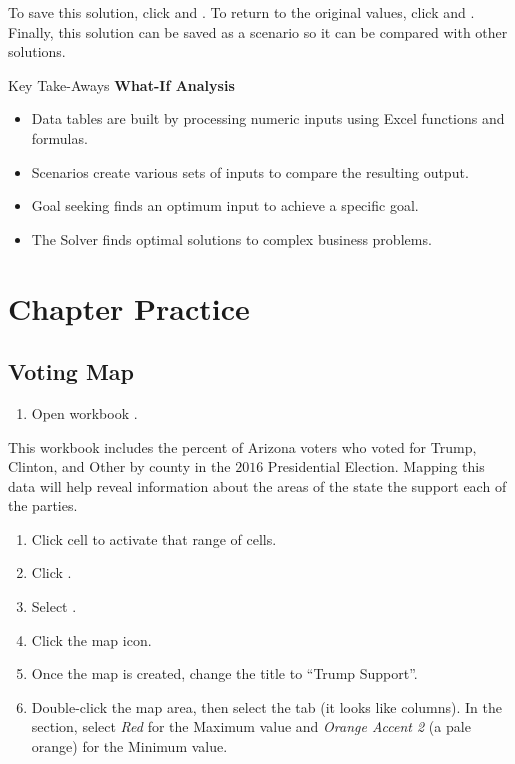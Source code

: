 To save this solution, click  and . To return to the original values, click  and . Finally, this solution can be saved as a scenario so it can be compared with other solutions.

\begin{center}
	\begin{tkwbox}{Key Take-Aways}
		\textbf{What-If Analysis}
		\\
		\begin{itemize}
			\setlength{\itemsep}{0pt}
			\setlength{\parskip}{0pt}
			\setlength{\parsep}{0pt}
			
			\item Data tables are built by processing numeric inputs using Excel functions and formulas.
			\item Scenarios create various sets of inputs to compare the resulting output.
			\item Goal seeking finds an optimum input to achieve a specific goal.
			\item The Solver finds optimal solutions to complex business problems.
			
		\end{itemize}
	\end{tkwbox}
\end{center}

\section{Chapter Practice}

\subsection{Voting Map}

\begin{enumerate}
	\item Open workbook .
\end{enumerate}

This workbook includes the percent of Arizona voters who voted for Trump, Clinton, and Other by county in the $ 2016 $ Presidential Election. Mapping this data will help reveal information about the areas of the state the support each of the parties.

\begin{enumerate}[resume]
	\item Click cell  to activate that range of cells.
	\item Click .
	\item Select .
	\item Click the map icon.
	\item Once the map is created, change the title to ``Trump Support''.
	\item Double-click the map area, then select the  tab (it looks like columns). In the  section, select \textit{Red} for the Maximum value and \textit{Orange Accent 2} (a pale orange) for the Minimum value. 
\end{enumerate}

